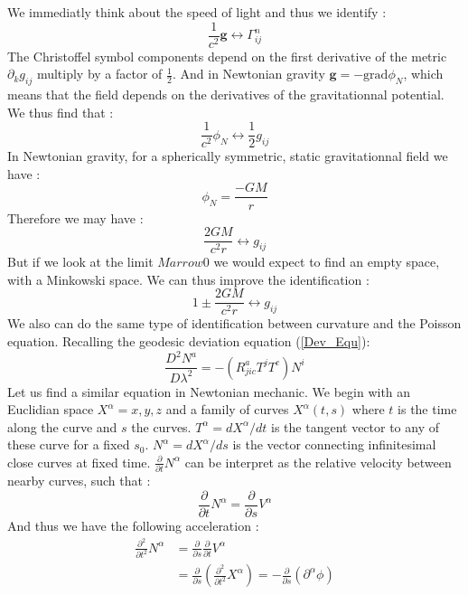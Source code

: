 \documentclass[a4paper,12pt]{article}
\theoremstyle{definition}
\begin{document}
We immediatly think about the speed of light and thus we identify :
\begin{equation}
	\frac{1}{c^2} \boldsymbol{g} \longleftrightarrow \Gamma^n_{ij}
\end{equation}
The Christoffel symbol components depend on the first derivative of the metric $\partial_kg_{ij}$ multiply by a factor of $\frac{1}{2}$.
And in Newtonian gravity $\boldsymbol{g}=-\text{grad}\phi_N$, which means that the field depends on the derivatives of the gravitationnal potential.
We thus find that :
\begin{equation}
	\frac{1}{c^2}\phi_N \longleftrightarrow \frac{1}{2}g_{ij}
\end{equation}
In Newtonian gravity, for a spherically symmetric, static gravitationnal field we have :
\begin{equation}
	\phi_N=\frac{-GM}{r}
\end{equation}
Therefore we may have :
\begin{equation}
	\frac{2GM}{c^2r} \longleftrightarrow g_{ij}
\end{equation}
But if we look at the limit $Marrow 0$ we would expect to find an empty space, with a Minkowski space.
We can thus improve the identification :
\begin{equation}
	1\pm\frac{2GM}{c^2r} \longleftrightarrow g_{ij}
\end{equation}
We also can do the same type of identification between curvature and the Poisson equation.
Recalling the geodesic deviation equation (\ref{Dev_Equ}):
\begin{equation}\label{Dev_Equ2}
	\frac{D^2N^a}{D\lambda^2}=-(R_{jic}^aT^jT^c)N^i
\end{equation}
Let us find a similar equation in Newtonian mechanic.
We begin with an Euclidian space $X^\alpha={x,y,z}$ and a family of curves $X^\alpha(t,s)$ where $t$ is the time along the curve and $s$ the curves.
$T^\alpha=dX^\alpha/dt$ is the tangent vector to any of these curve for a fixed $s_0$.
$N^\alpha=dX^\alpha/ds$ is the vector connecting infinitesimal close curves at fixed time.
$\frac{\partial}{\partial t}N^\alpha$ can be interpret as the relative velocity between nearby curves, such that :
\begin{equation}
	\frac{\partial}{\partial t}N^\alpha=\frac{\partial}{\partial s}V^\alpha
\end{equation}
And thus we have the following acceleration :
\begin{equation}
\begin{split}
	\frac{\partial^2}{\partial t^2}N^\alpha&=\frac{\partial}{\partial s}\frac{\partial}{\partial t}V^\alpha \\
	&=\frac{\partial}{\partial s}(\frac{\partial^2}{\partial t^2}X^\alpha)=-\frac{\partial}{\partial s}(\partial^\alpha \phi)
\end{split}
\end{equation}
\end{document}
